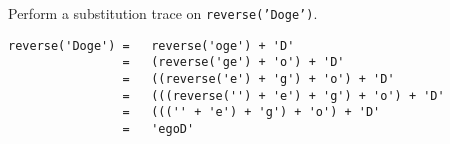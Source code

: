 Perform a substitution trace on \texttt{reverse('Doge')}.

\begin{answer}
\begin{lstlisting}[numbers=none]
reverse('Doge')	=	reverse('oge') + 'D'
				=	(reverse('ge') + 'o') + 'D'
				=	((reverse('e') + 'g') + 'o') + 'D'
				=	(((reverse('') + 'e') + 'g') + 'o') + 'D'
				=	((('' + 'e') + 'g') + 'o') + 'D'
				=	'egoD'
\end{lstlisting}
\end{answer}
